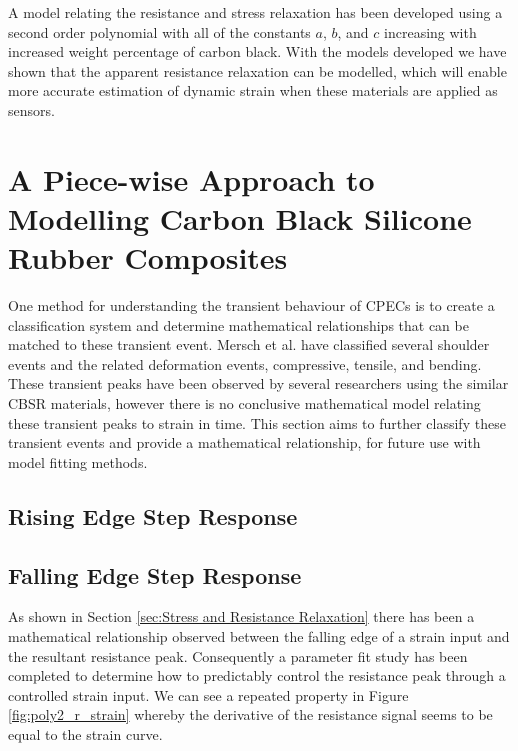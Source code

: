 A model relating the resistance and stress relaxation has been developed using a second order polynomial with all of the constants $a$, $b$, and $c$ increasing with increased weight percentage of carbon black. With the models developed we have shown that the apparent resistance relaxation can be modelled, which will enable more accurate estimation of dynamic strain when these materials are applied as sensors. 


\section{A Piece-wise Approach to Modelling Carbon Black Silicone Rubber Composites}
One method for understanding the transient behaviour of CPECs is to create a classification system and determine mathematical relationships that can be matched to these transient event. Mersch et al. have classified several shoulder events and the related deformation events, compressive, tensile, and bending. These transient peaks have been observed by several researchers using the similar CBSR materials, however there is no conclusive mathematical model relating these transient peaks to strain in time. This section aims to further classify these transient events and provide a mathematical relationship, for future use with model fitting methods.


\subsection{Rising Edge Step Response}


\subsection{Falling Edge Step Response}
As shown in Section \ref{sec:Stress and Resistance Relaxation} there has been a mathematical relationship observed between the falling edge of a strain input and the resultant resistance peak. Consequently a parameter fit study has been completed to determine how to predictably control the resistance peak through a controlled strain input. We can see a repeated property in Figure \ref{fig:poly2_r_strain} whereby the derivative of the resistance signal seems to be equal to the strain curve. 

